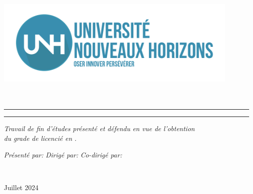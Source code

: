 \begin{titlepage}
    \begin{center}
        \large
        
        \vspace*{.03\textheight}
        \includegraphics[width=12cm]{Images/logo_unh} \\[0.75cm]
        
        {\LARGE{{\textsc{\myFaculty}}} }\\[0.2cm]
        
        {\LARGE{{{\myDepartment}}} }\\
        \medskip %
        
        \vspace{2.5cm} 
        \begin{center}
            \rule{0.9\textwidth}{.2pt}
        \end{center}
        \vspace{0.2cm}
        
        {\LARGE \bfseries {\myTitle}}
        
        \begin{center}
            \rule{0.9\textwidth}{.2pt}
        \end{center}

        \begin{flushright}
            {\slshape \textit{Travail de fin d’études présenté et défendu en vue de l’obtention\\ du grade de licencié en \myFaculty.}}\\[2cm] 
        \end{flushright}
        
        \begin{minipage}[t]{0.55\textwidth}
            \begin{flushright}
                \large
                \emph{Présenté par:} \textbf{{\myName}}
                \emph{Dirigé par:} \textbf{{\myProf}}  
                \emph{Co-dirigé par:} \textbf{{\mySupervisor}} 
            \end{flushright}
        \end{minipage}\\[3cm]
        \vfill
        
        {\large Juillet 2024}\\
    \end{center}
\end{titlepage}
